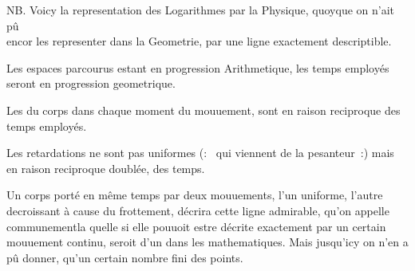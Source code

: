 \pstart
NB. Voicy la representation des Logarithmes par la Physique, quoyque on n'ait p\^{u}\\
\hspace*{7,5mm}encor les representer dans la Geometrie, par une ligne exactement descriptible.
\pend
\begin{Geometrico}
Les espaces parcourus estant en progression Arithmetique, les temps employ\'{e}s seront en progression geometrique.
\end{Geometrico}
\begin{Geometrico}
Les  du corps dans chaque moment du mouuement, sont en raison reciproque des temps employ\'{e}s.
\end{Geometrico}
\begin{Geometrico}
Les retardations ne sont pas uniformes (:~ qui viennent de la pesanteur~:) mais en raison reciproque doubl\'{e}e, des
temps.
%
%
\end{Geometrico}
\begin{Geometrico}
Un corps port\'{e} en m\^{e}me temps par deux mouuements, l'un uniforme, l'autre decroissant \`{a} cause du frottement, d\'{e}crira cette ligne admirable, qu'on appelle communementla quelle si elle pouuoit estre d\'{e}crite exactement par un certain mou\-uement continu, seroit d'un  dans les mathematiques. Mais jusqu'icy on n'en a p\^{u} donner, qu'un certain nombre fini des points.
\end{Geometrico}
\count{}
\count{}
\count{}

